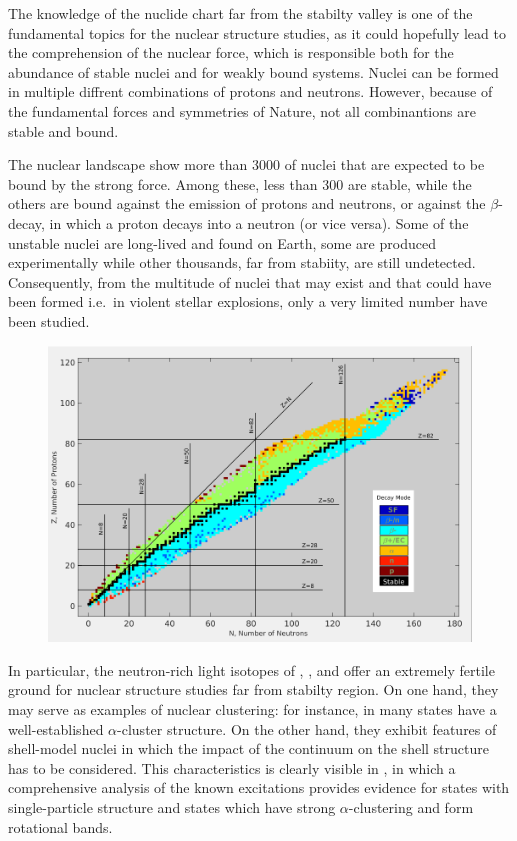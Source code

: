The knowledge of the nuclide chart far from the stabilty valley is one of the
fundamental topics for the nuclear structure studies, as it could hopefully
lead to the comprehension of the nuclear force, which is responsible both for
the abundance of stable nuclei and for weakly bound systems.
Nuclei can be formed in multiple diffrent combinations of protons and neutrons.
However, because of the fundamental forces and symmetries of Nature, not all
combinantions are stable and bound.

\bigbreak

The nuclear landscape show more than $3000$ of nuclei that are expected to be
bound by the strong force. Among these, less than $300$ are stable, while the
others are bound against the emission of protons and neutrons, or against the
$\beta$-decay, in which a proton decays into a neutron (or vice versa). Some
of the unstable nuclei are long-lived and found on Earth, some are produced
experimentally while other thousands, far from stabiity, are still undetected.
Consequently, from the multitude of nuclei that may exist and that could have
been formed i.e.\ in violent stellar explosions, only a very limited number
have been studied.

\bigbreak

\begin{figure}[h]
  \centering
  \includegraphics[scale=.35]{img/DecayModeNuDat2.png}
\end{figure}

\bigbreak

In particular, the neutron-rich light isotopes of , ,  and
 offer an extremely fertile ground for nuclear structure studies far
from stabilty region. On one hand, they may serve as examples of nuclear
clustering: for instance, in  many states have a well-established
$\alpha$-cluster structure. On the other hand, they exhibit features of
shell-model nuclei in which the impact of the continuum on the shell structure
has to be considered. This characteristics is clearly visible in ,
in which a comprehensive analysis of the known excitations provides evidence
for states with single-particle structure and states which have strong
$\alpha$-clustering and form rotational bands.

